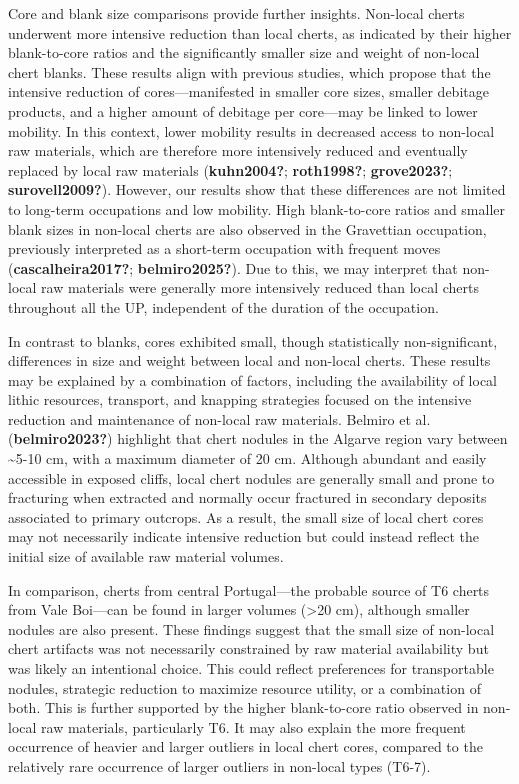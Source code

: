 \documentclass[
  a4paper,
  DIV=11,
  numbers=noendperiod]{scrreprt}
\begin{document}
Core and blank size comparisons provide further insights. Non-local
cherts underwent more intensive reduction than local cherts, as
indicated by their higher blank-to-core ratios and the significantly
smaller size and weight of non-local chert blanks. These results align
with previous studies, which propose that the intensive reduction of
cores---manifested in smaller core sizes, smaller debitage products, and
a higher amount of debitage per core---may be linked to lower mobility.
In this context, lower mobility results in decreased access to non-local
raw materials, which are therefore more intensively reduced and
eventually replaced by local raw materials (\textbf{kuhn2004?};
\textbf{roth1998?}; \textbf{grove2023?}; \textbf{surovell2009?}).
However, our results show that these differences are not limited to
long-term occupations and low mobility. High blank-to-core ratios and
smaller blank sizes in non-local cherts are also observed in the
Gravettian occupation, previously interpreted as a short-term occupation
with frequent moves (\textbf{cascalheira2017?}; \textbf{belmiro2025?}).
Due to this, we may interpret that non-local raw materials were
generally more intensively reduced than local cherts throughout all the
UP, independent of the duration of the occupation.

In contrast to blanks, cores exhibited small, though statistically
non-significant, differences in size and weight between local and
non-local cherts. These results may be explained by a combination of
factors, including the availability of local lithic resources,
transport, and knapping strategies focused on the intensive reduction
and maintenance of non-local raw materials. Belmiro et al.
(\textbf{belmiro2023?}) highlight that chert nodules in the Algarve
region vary between \textasciitilde5-10 cm, with a maximum diameter of
20 cm. Although abundant and easily accessible in exposed cliffs, local
chert nodules are generally small and prone to fracturing when extracted
and normally occur fractured in secondary deposits associated to primary
outcrops. As a result, the small size of local chert cores may not
necessarily indicate intensive reduction but could instead reflect the
initial size of available raw material volumes.

In comparison, cherts from central Portugal---the probable source of T6
cherts from Vale Boi---can be found in larger volumes (\textgreater20
cm), although smaller nodules are also present. These findings suggest
that the small size of non-local chert artifacts was not necessarily
constrained by raw material availability but was likely an intentional
choice. This could reflect preferences for transportable nodules,
strategic reduction to maximize resource utility, or a combination of
both. This is further supported by the higher blank-to-core ratio
observed in non-local raw materials, particularly T6. It may also
explain the more frequent occurrence of heavier and larger outliers in
local chert cores, compared to the relatively rare occurrence of larger
outliers in non-local types (T6-7).
\end{document}
